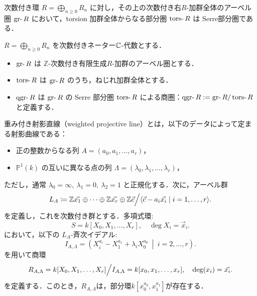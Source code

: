\begin{prop}
次数付き環 \( R = \bigoplus_{n \ge 0} R_n \) に対し，その上の次数付き右$R$-加群全体のアーベル圏 \(\gr R\) において，torsion 加群全体からなる部分圏 \(\tors R\) は Serre部分圏である．
\end{prop}

\begin{defn}\cite{AZ94}
\(
R = \bigoplus_{n \ge 0} R_n
\) を次数付きネーター${\mathbb C}$-代数とする．\vspace{-3mm}
\begin{itemize}
  \item $\gr R$ は $\mathbb{Z}$-次数付き有限生成$R$-加群のアーベル圏とする．
  \item $\tors R$ は $\gr R$ のうち，ねじれ加群全体とする．
  \item $\qgr R$ は $\gr R$ の Serre 部分圏 $\tors R$ による商圏：$\qgr R := \gr R / \tors R$ と定義する．
\end{itemize}
\end{defn}

\begin{defn}\cite{GL87}
重み付き射影直線（weighted projective line）とは，以下のデータによって定まる射影曲線である：

\begin{itemize}
  \item 正の整数からなる列 $A = (a_0, a_1, \dots, a_r)$，
  \item $\mathbb{P}^1(k)$ の互いに異なる点の列 $\Lambda = (\lambda_0, \lambda_1, \dots, \lambda_r)$，
\end{itemize}

ただし，通常 $\lambda_0 = \infty,\ \lambda_1 = 0,\ \lambda_2 = 1$ と正規化する．次に，アーベル群
\[
	L_{A} \coloneq {\mathbb Z} \vec{x_1}\oplus\cdots\oplus{\mathbb Z} \vec{x_r}\oplus {\mathbb Z}\vec{c}\Big{/}\langle\vec{c} -a_i\vec{x_i}\mid i=1,\ldots,r\rangle.
\]
を定義し，これを次数付き群とする．多項式環: 
\[
	S = k[X_0, X_1, \dots, X_r], \quad \deg X_i = \vec{x}_i. 
\]
において，以下の $L_A$-斉次イデアル:
\[
	I_{A,\Lambda} = \left( X_i^{a_i} - X_1^{a_1} + \lambda_i X_0^{a_0} \ \middle|\ i = 2, \dots, r \right).
\]
を用いて商環
\[
	R_{A,\Lambda} = k[X_0, X_1, \dots, X_r]\Big{/}I_{A,\Lambda} = k[x_0,x_1,\ldots, x_r],\quad \deg(x_i)=\vec{x_i}.
\]
を定義する．このとき，$R_{A,\Lambda}$は，部分環$k[x_0^{a_0},x_1^{a_1}]$が存在する．
\end{defn}


